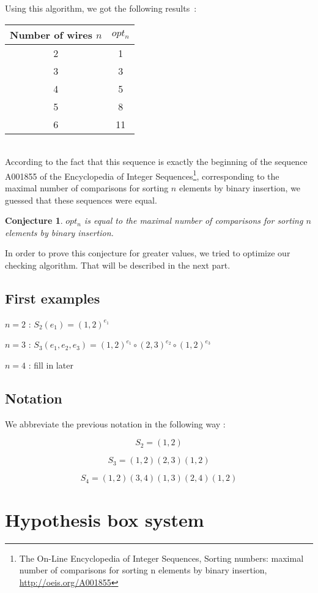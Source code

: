\documentclass[11pt, a4paper]{article}
\newtheorem*{Conj*}{Conjecture}
\begin{document}
Using this algorithm, we got the following results~:

\begin{tabular}{|c|c|}
\hline
Number of wires $n$ & $opt_n$ \\
\hline
2 & 1 \\
3 & 3 \\
4 & 5 \\
5 & 8 \\
6 & 11 \\
\hline
\end{tabular}\\

According to the fact that this sequence is exactly the beginning of the
sequence A001855 of the Encyclopedia of Integer Sequences\footnote{The On-Line
Encyclopedia of Integer Sequences, Sorting numbers: maximal number of
comparisons for sorting n elements by binary insertion,
\url{http://oeis.org/A001855}}, corresponding to the maximal number of
comparisons for sorting $n$ elements by binary insertion, we guessed that these
sequences were equal.

\Large
\begin{Conj*}
$opt_n$ is equal to the maximal number of comparisons for sorting $n$ elements
by binary insertion.
\end{Conj*}
\normalsize

In order to prove this conjecture for greater values, we tried to optimize our
checking algorithm. That will be described in the next part.

\subsection{First examples}

$n=2$ : $S_2(e_1) = (1,2)^{e_1}$

$n=3$ : $S_3(e_1,e_2,e_3) = (1,2)^{e_1} \circ (2,3)^{e_2} \circ (1,2)^{e_3}$

$n=4$ : fill in later

\subsection {Notation}

We abbreviate the previous notation in the following way :

$$S_2 = (1,2)$$

$$S_3 = (1,2)(2,3)(1,2)$$

$$S_4 = (1,2)(3,4)(1,3)(2,4)(1,2)$$

\section{Hypothesis box system}
\end{document}
